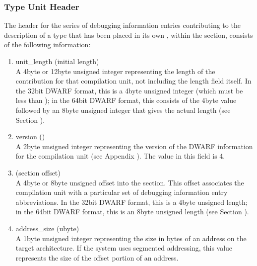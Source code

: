 \subsubsection{Type Unit Header}
\label{datarep:typeunitheader}

The header for the series of debugging information entries
contributing to the description of a type that has been
placed in its own , within the 
 section,
consists of the following information:
\begin{enumerate}[1. ]

\item unit\_length (initial length) \\
A 4\dash byte or 12\dash byte unsigned integer 
representing the length
of the  contribution for that compilation unit,
not including the length field itself. In the 32\dash bit DWARF
format, this is a 4\dash byte unsigned integer (which must be
less than \xfffffffzero); in the 64\dash bit DWARF format, this
consists of the 4\dash byte value \wffffffff followed by an 
8\dash byte unsigned integer that gives the actual length
(see Section ).

\item  version () \\
A 2\dash byte unsigned integer representing the version of the
DWARF information for the 
compilation unit 
(see Appendix ). 
The value in this field is 4.

\item {} (section offset) \\
A 
4\dash byte or 8\dash byte unsigned offset into the 
section. This offset associates the compilation unit with a
particular set of debugging information entry abbreviations. In
the 32\dash bit DWARF format, this is a 4\dash byte unsigned length;
in the 64\dash bit DWARF format, this is an 8\dash byte unsigned length
(see Section ).

\item address\_size (ubyte) \\
A 1\dash byte unsigned integer representing the size 
in bytes of
an address on the target architecture. If the system uses
segmented addressing, this value represents the size of the
offset portion of an address.



\end{enumerate}
